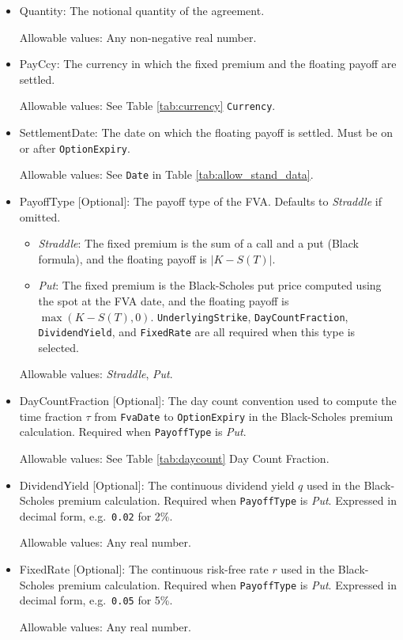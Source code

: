 \begin{itemize}
\item Quantity: The notional quantity of the agreement.

  Allowable values: Any non-negative real number.

\item PayCcy: The currency in which the fixed premium and the floating payoff are settled.

  Allowable values: See Table \ref{tab:currency} \lstinline!Currency!.

\item SettlementDate: The date on which the floating payoff is settled. Must be on or after \lstinline!OptionExpiry!.

  Allowable values: See \lstinline!Date! in Table \ref{tab:allow_stand_data}.

\item PayoffType [Optional]: The payoff type of the FVA. Defaults to \emph{Straddle} if omitted.

  \begin{itemize}
  \item \emph{Straddle}: The fixed premium is the sum of a call and a put (Black formula), and the floating payoff
    is $|K - S(T)|$.
  \item \emph{Put}: The fixed premium is the Black-Scholes put price computed using the spot at the FVA date, and
    the floating payoff is $\max(K - S(T), 0)$. \lstinline!UnderlyingStrike!, \lstinline!DayCountFraction!,
    \lstinline!DividendYield!, and \lstinline!FixedRate! are all required when this type is selected.
  \end{itemize}

  Allowable values: \emph{Straddle}, \emph{Put}.

\item DayCountFraction [Optional]: The day count convention used to compute the time fraction $\tau$ from
  \lstinline!FvaDate! to \lstinline!OptionExpiry! in the Black-Scholes premium calculation. Required when
  \lstinline!PayoffType! is \emph{Put}.

  Allowable values: See Table \ref{tab:daycount} Day Count Fraction.

\item DividendYield [Optional]: The continuous dividend yield $q$ used in the Black-Scholes premium calculation.
  Required when \lstinline!PayoffType! is \emph{Put}. Expressed in decimal form, e.g.\ \lstinline!0.02! for 2\%.

  Allowable values: Any real number.

\item FixedRate [Optional]: The continuous risk-free rate $r$ used in the Black-Scholes premium calculation.
  Required when \lstinline!PayoffType! is \emph{Put}. Expressed in decimal form, e.g.\ \lstinline!0.05! for 5\%.

  Allowable values: Any real number.
\end{itemize}

